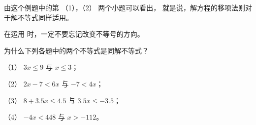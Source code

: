 由这个例题中的第 （1），（2） 两个小题可以看出，
就是说，解方程的移项法则对于解不等式同样适用。

\zhuyi 在运用 时，一定不要忘记改变不等号的方向。


\lianxi

为什么下列各题中的两个不等式是同解不等式？

（1） $3x \leqslant 9$ 与 $x \leqslant 3$；

（2） $2x - 7 < 6x$ 与 $-7 < 4x$；

（3） $8 + 3.5x \leqslant 4.5$ 与 $3.5x \leqslant -3.5$；

（4） $-4x < 448$ 与 $x > -112$。


